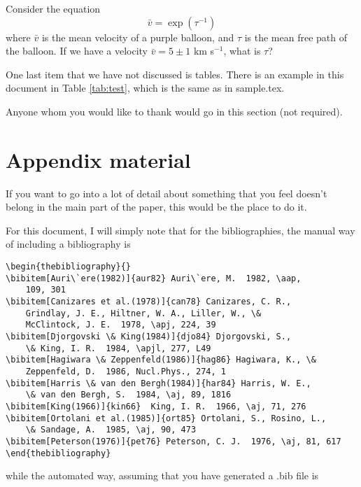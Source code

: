 \documentclass{emulateapj}
\begin{document}
Consider the equation
\begin{equation}
\bar v = \exp(\tau^{-1})
\end{equation}
where $\bar v$ is the mean velocity of a purple balloon, and $\tau$ is
the mean free path of the balloon. If we have a velocity $\bar v = 5\pm1$ km s$^{-1}$,
what is $\tau$?

One last item that we have not discussed is tables. There is an example in this
document in Table \ref{tab:test}, which is the same as in sample.tex.

\acknowledgments

Anyone whom you would like to thank would go in this section (not required). 


\appendix

\section{Appendix material}

If you want to go into a lot of detail about something that you feel doesn't belong
in the main part of the paper, this would be the place to do it. 

For this document, I will simply note that for the bibliographies, the manual
way of including a bibliography is
\begin{verbatim}
\begin{thebibliography}{}
\bibitem[Auri\`ere(1982)]{aur82} Auri\`ere, M.  1982, \aap,
    109, 301
\bibitem[Canizares et al.(1978)]{can78} Canizares, C. R.,
    Grindlay, J. E., Hiltner, W. A., Liller, W., \&
    McClintock, J. E.  1978, \apj, 224, 39
\bibitem[Djorgovski \& King(1984)]{djo84} Djorgovski, S.,
    \& King, I. R.  1984, \apjl, 277, L49
\bibitem[Hagiwara \& Zeppenfeld(1986)]{hag86} Hagiwara, K., \&
    Zeppenfeld, D.  1986, Nucl.Phys., 274, 1
\bibitem[Harris \& van den Bergh(1984)]{har84} Harris, W. E.,
    \& van den Bergh, S.  1984, \aj, 89, 1816
\bibitem[King(1966)]{kin66}  King, I. R.  1966, \aj, 71, 276
\bibitem[Ortolani et al.(1985)]{ort85} Ortolani, S., Rosino, L.,
    \& Sandage, A.  1985, \aj, 90, 473
\bibitem[Peterson(1976)]{pet76} Peterson, C. J.  1976, \aj, 81, 617
\end{thebibliography}
\end{verbatim}

while the automated way, assuming that you have generated a .bib file is
\begin{verbatim}


\end{verbatim}
\end{document}
